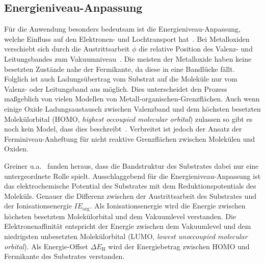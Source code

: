         \subsection{Energieniveau-Anpassung}
            Für die Anwendung besonders bedeutsam ist die Energieniveau-Anpassung, welche Einfluss auf den Elektronen- und Lochtransport hat~\cite{IF_4}.
            Bei Metalloxiden verschiebt sich durch die Austrittsarbeit $\phi$ die relative Position des Valenz- und Leitungsbandes zum Vakuumniveau~\cite{IF_3}.
            Die meisten der Metalloxide haben keine besetzten Zustände nahe der Fermikante, da diese in eine Bandlücke fällt.
            Folglich ist auch Ladungsübertrag vom Substrat auf die Moleküle nur vom Valenz- oder Leitungsband aus möglich.
            Dies unterscheidet den Prozess maßgeblich von vielen Modellen von Metall-organischen-Grenzflächen.
            Auch wenn einige Oxide Ladungsaustausch zwischen Valenzband und dem höchsten besetzten Molekülorbital (HOMO, \textit{highest occoupied molecular orbital}) zulassen so  gibt es noch kein Model, dass dies beschreibt~\cite{IF_3}.
            Verbreitet ist jedoch der Ansatz der Ferminiveau-Anheftung für nicht reaktive Grenzflächen zwischen Molekülen und Oxiden.

            Greiner u.a.~\cite{IF_3} fanden heraus, dass die Bandstruktur des Substrates dabei nur eine untergeordnete Rolle spielt.
            Ausschlaggebend für die Energieniveau-Anpassung ist das elektrochemische Potential des Substrates mit dem Reduktionspotentials des Moleküls.
            Genauer die Differenz zwischen der Austrittsarbeit des Substrates und der Ionisationsenergie $IE_\text{org}$.
            Als Ionisationsenergie wird die Energie zwischen höchsten besetztem Molekülorbital und dem Vakuumlevel verstanden.
            Die Elektronenaffinität entspricht der Energie zwischen dem Vakuumlevel und dem niedrigsten unbesetzten Molekülorbital (LUMO, \textit{lowest unoccoupied molecular orbital}).
            Als Energie-Offset $\Delta E_\text{H}$ wird der Energiebetrag zwischen HOMO und Fermikante des Substrates verstanden.

